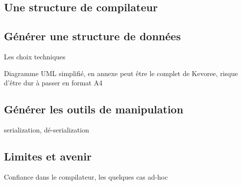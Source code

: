 \subsection{Une structure de compilateur}

\cite{freeman2004head} \cite{Appel2003MCI599718}

\subsection{Générer une structure de données}

Les choix techniques

Diagramme UML simplifié, en annexe peut être le complet de Kevoree, risque d'être dur à passer en format A4

\subsection{Générer les outils de manipulation}

serialization, dé-serialization

\subsection{Limites et avenir}

Confiance dans le compilateur, les quelques cas ad-hoc




